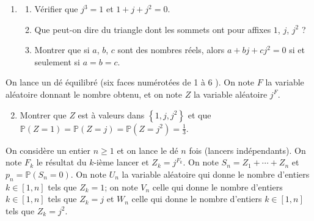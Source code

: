 \documentclass[landscape,twocolumn,leqno,a4paper,10pt]{report} %
\newcommand\n{\noindent}
\renewcommand{\geq}{\geqslant}
\newcommand{\Prob}{\mathbb{P}}
\begin{document}
\begin{enumerate}
	\item \begin{enumerate}
		\item Vérifier que $j^{3}=1$ et $1+j+j^{2}=0$.
		\item Que peut-on dire du triangle dont les sommets ont pour affixes $1$, $j$, $j^{2}$ ?
		\item Montrer que si $a$, $b$, $c$ sont des nombres réels, alors $a+b j+c j^{2}=0$ si et seulement si $a=b=c$.
	\end{enumerate}
\end{enumerate}

\n On lance un dé équilibré (six faces numérotées de 1 à 6 ). On note $F$ la variable aléatoire donnant le nombre obtenu, et on note $Z$ la variable aléatoire $j^{F}$.

\begin{enumerate}\setcounter{enumi}{1}
	\item Montrer que $Z$ est à valeurs dans $\left\{1, j, j^{2}\right\}$ et que $\Prob(Z=1)=\Prob(Z=j)=\Prob\left(Z=j^{2}\right)=\frac{1}{3}$.
\end{enumerate}

\n On considère un entier $n \geq 1$ et on lance le dé $n$ fois (lancers indépendants). On note $F_{k}$ le résultat du $k$-ième lancer et $Z_{k}=j^{F_{k}}$. On note $S_{n}=Z_{1}+\cdots+Z_{n}$ et $p_{n}=\Prob\left(S_{n}=0\right)$. On note $U_{n}$ la variable aléatoire qui donne le nombre d'entiers $k \in[1, n]$ tels que $Z_{k}=1$; on note $V_{n}$ celle qui donne le nombre d'entiers $k \in[1, n]$ tels que $Z_{k}=j$ et $W_{n}$ celle qui donne le nombre d'entiers $k \in[1, n]$ tels que $Z_{k}=j^{2}$.
\end{document}
